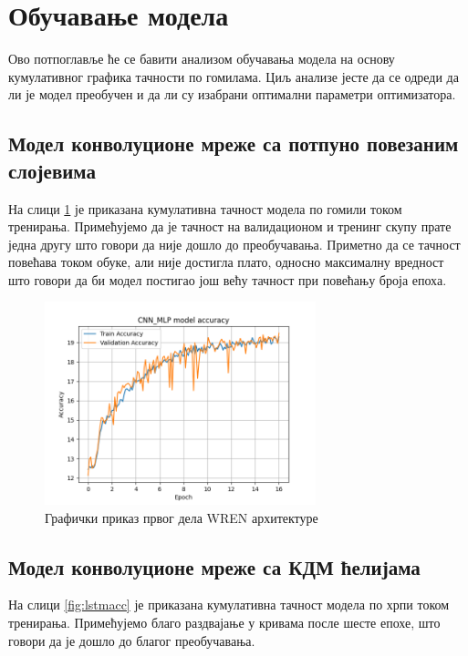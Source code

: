\documentclass[a4paper, 12pt, master, utf8]{etf}
\begin{document}
\section{Обучавање модела}
\label{sec:53}
Ово потпоглавље ће се бавити анализом обучавања модела на основу кумулативног графика тачности по гомилама. Циљ анализе јесте да се одреди да ли је модел преобучен и да ли су изабрани оптимални параметри оптимизатора.

\subsection{Модел конволуционе мреже са потпуно повезаним слојевима}

На слици \ref{fig:mlpacc} је приказана кумулативна тачност модела по гомили током тренирања. Примећујемо да 
је тачност на валидационом и тренинг скупу прате једна другу што говори да није дошло до преобучавања. 
Приметно да се тачност повећава током обуке, али није достигла плато, односно максималну вредност што говори да би модел постигао још већу тачност
при повећању броја епоха.
\newline

\begin{figure}[H]
    \centering
    \includegraphics[width=0.7\textwidth]{../Results/CNN_MLP_19_09_09/accuracy.png}
    \caption{Графички приказ првог дела WREN архитектуре}
    \label{fig:mlpacc}
\end{figure}


\subsection{Модел конволуционе мреже са КДМ ћелијама}

На слици \ref{fig:lstmacc} је приказана кумулативна тачност модела по хрпи током тренирања. Примећујемо благо раздвајање у кривама после шесте епохе, што говори да је дошло до благог преобучавања. 
\end{document}
